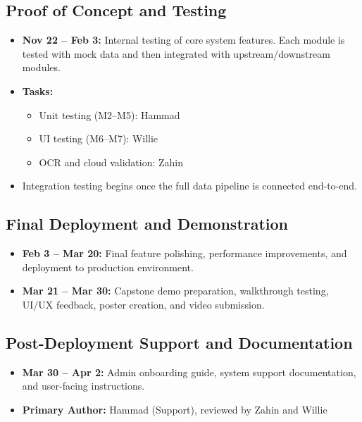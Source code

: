 \documentclass[12pt, titlepage]{article}
\begin{document}
\subsection{Proof of Concept and Testing}
\label{SecTest}

\begin{itemize}
  \item \textbf{Nov 22 – Feb 3:} Internal testing of core system features. Each module is tested with mock data and then integrated with upstream/downstream modules.
  \item \textbf{Tasks:}
  \begin{itemize}
    \item Unit testing (M2–M5): Hammad
    \item UI testing (M6–M7): Willie
    \item OCR and cloud validation: Zahin
  \end{itemize}
  \item Integration testing begins once the full data pipeline is connected end-to-end.
\end{itemize}

\subsection{Final Deployment and Demonstration}
\label{SecDeploy}

\begin{itemize}
  \item \textbf{Feb 3 – Mar 20:} Final feature polishing, performance improvements, and deployment to production environment.
  \item \textbf{Mar 21 – Mar 30:} Capstone demo preparation, walkthrough testing, UI/UX feedback, poster creation, and video submission.
\end{itemize}

\subsection{Post-Deployment Support and Documentation}
\label{SecSupport}

\begin{itemize}
  \item \textbf{Mar 30 – Apr 2:} Admin onboarding guide, system support documentation, and user-facing instructions.
  \item \textbf{Primary Author:} Hammad (Support), reviewed by Zahin and Willie
\end{itemize}


\newpage{}
\end{document}
